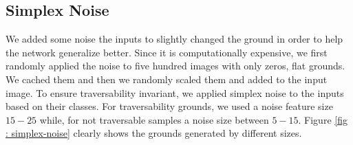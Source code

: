 \documentclass[../document.tex]{subfiles}
\begin{document}
\subsection{Simplex Noise} 
We added some noise the inputs to slightly changed the ground in order to help the network generalize better. Since it is computationally expensive, we first randomly applied the noise to five hundred images with only zeros, flat grounds. We cached them and then we randomly scaled them and added to the input image. To ensure traversability invariant, we applied simplex noise to the inputs based on their classes. For traversability grounds, we used a noise feature size $15 - 25$  while, for not traversable samples a noise size between $5 -15 $. Figure \ref{fig : simplex-noise} clearly shows the grounds generated by different sizes.  
\begin{figure}[htbp]
    \centering


\end{figure}
\end{document}

